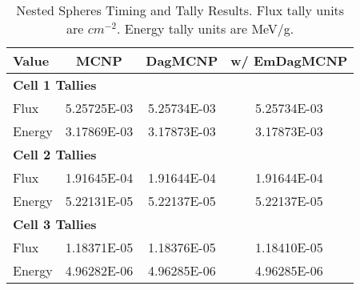 \documentclass{anstrans}
\begin{document}
\begin{table}

  \begin{center}
    \caption{Nested Spheres Timing and Tally Results. Flux tally units are $cm^{-2}$. Energy tally units are MeV/g.}
    
    \begin{tabular}{lccc}
      \toprule
      Value & MCNP & DagMCNP & w/ EmDagMCNP \\
      \toprule
      \multicolumn{4}{l}{\textbf{Cell 1 Tallies}} \\
      \hline
      Flux  & 5.25725E-03 & 5.25734E-03 & 5.25734E-03 \\
      Energy  & 3.17869E-03 &  3.17873E-03 &  3.17873E-03 \\
      \hline
      \multicolumn{4}{l}{\textbf{Cell 2 Tallies}} \\
      \hline
      Flux  & 1.91645E-04 & 1.91644E-04 & 1.91644E-04 \\
      Energy  & 5.22131E-05 & 5.22137E-05 & 5.22137E-05 \\
      \hline
      \multicolumn{4}{l}{\textbf{Cell 3 Tallies}} \\
      \hline
      Flux  & 1.18371E-05 & 1.18376E-05 & 1.18410E-05 \\
      Energy  & 4.96282E-06 & 4.96285E-06 & 4.96285E-06 \\
      \bottomrule
                        
    \end{tabular}


  \end{center}
\end{table}
\end{document}
